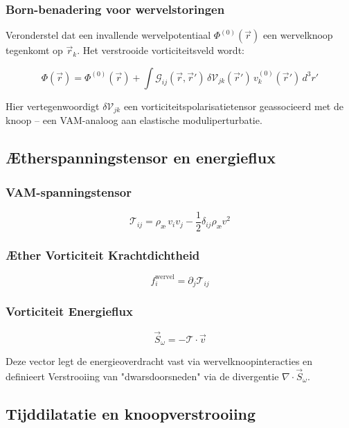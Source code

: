 \subsubsection*{Born-benadering voor wervelstoringen}

Veronderstel dat een invallende wervelpotentiaal \(\Phi^{(0)}(\vec{r})\) een wervelknoop tegenkomt op \(\vec{r}_k\). Het verstrooide vorticiteitsveld wordt:

\[
\Phi(\vec{r}) = \Phi^{(0)}(\vec{r}) + \int \mathcal{G}_{ij}(\vec{r}, \vec{r}') \, \delta \mathcal{V}_{jk}(\vec{r}') \, v_k^{(0)}(\vec{r}') \, d^3r'
\]

Hier vertegenwoordigt \(\delta \mathcal{V}_{jk}\) een vorticiteitspolarisatietensor geassocieerd met de knoop – een VAM-analoog aan elastische moduliperturbatie.

\subsection{Ætherspanningstensor en energieflux}

\subsubsection*{VAM-spanningstensor}

\[
\mathcal{T}_{ij} = \rho_\text{\ae} \, v_i v_j - \frac{1}{2} \delta_{ij} \rho_\text{\ae} v^2
\]

\subsubsection*{Æther Vorticiteit Krachtdichtheid}

\[
f_i^\text{wervel} = \partial_j \mathcal{T}_{ij}
\]

\subsubsection*{Vorticiteit Energieflux}

\[
\vec{S}_\omega = - \mathcal{T} \cdot \vec{v}
\]

Deze vector legt de energieoverdracht vast via wervelknoopinteracties en definieert Verstrooiing van "dwarsdoorsneden" via de divergentie \(\nabla \cdot \vec{S}_\omega\).

\subsection{Tijddilatatie en knoopverstrooiing}

